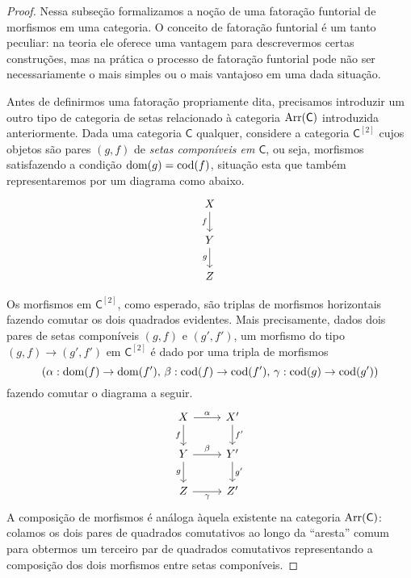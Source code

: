 \begin{proof}
  Nessa subseção formalizamos a noção de uma fatoração funtorial de morfismos em uma categoria.
  O conceito de fatoração funtorial é um tanto peculiar: na teoria ele oferece uma vantagem para descrevermos certas construções, mas na prática o processo de fatoração funtorial pode não ser necessariamente o mais simples ou o mais vantajoso em uma dada situação.
  
  Antes de definirmos uma fatoração propriamente dita, precisamos introduzir um outro tipo de categoria de setas relacionado à categoria $\mathrm{Arr}(\mathsf{C})$ introduzida anteriormente.
  Dada uma categoria $\mathsf{C}$ qualquer, considere a categoria $\mathsf{C}^{[2]}$ cujos objetos são pares $(g,f)$ de \emph{setas componíveis em $\mathsf{C}$}, ou seja, morfismos satisfazendo a condição $\mathrm{dom}(g) = \mathrm{cod}(f)$, situação esta que também representaremos por um diagrama como abaixo.
  \begin{displaymath}
    \begin{tikzcd}
      X
      \arrow[d, "f" swap]
      \\ Y
      \arrow[d, "g" swap]
      \\ Z
    \end{tikzcd}
  \end{displaymath}
  
  Os morfismos em $\mathsf{C}^{[2]}$, como esperado, são triplas de morfismos horizontais fazendo comutar os dois quadrados evidentes.
  Mais precisamente, dados dois pares de setas componíveis $(g,f)$ e $(g',f')$, um morfismo do tipo $(g,f) \to (g',f')$ em $\mathsf{C}^{[2]}$ é dado por uma tripla de morfismos
  \begin{displaymath}
    (\alpha: \mathrm{dom}(f) \to \mathrm{dom}(f'),\, \beta: \mathrm{cod}(f) \to \mathrm{cod}(f'),\, \gamma: \mathrm{cod}(g) \to \mathrm{cod}(g'))
  \end{displaymath}
  fazendo comutar o diagrama a seguir.
  \begin{equation}\label{eq:morfismo_setas_componiveis_diag}
    \begin{tikzcd}
      X
      \arrow[r, "\alpha"]
      \arrow[d, "f" swap]
      & X'
      \arrow[d, "f'"]
      \\ Y
      \arrow[r, "\beta"]
      \arrow[d, "g" swap]
      & Y'
      \arrow[d, "g'"]
      \\ Z
      \arrow[r, "\gamma" swap]
      & Z'
    \end{tikzcd}
  \end{equation}
  A composição de morfismos é análoga àquela existente na categoria $\mathrm{Arr}(\mathsf{C})$: colamos os dois pares de quadrados comutativos ao longo da ``aresta'' comum para obtermos um terceiro par de quadrados comutativos representando a composição dos dois morfismos entre setas componíveis.
  

\end{proof}
